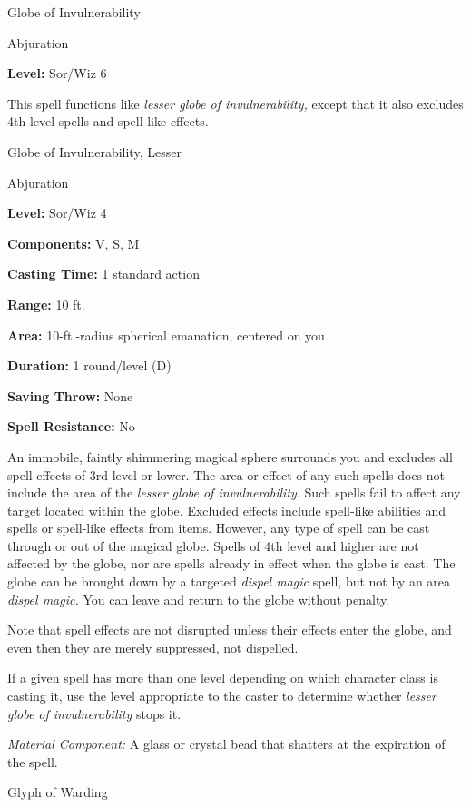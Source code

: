 \documentclass{article}
\begin{document}
\vspace{12pt}
Globe of Invulnerability

Abjuration

\textbf{Level:} Sor/Wiz 6

This spell functions like \textit{lesser globe of invulnerability, }except that 
it also excludes 4th-level spells and spell-like effects.

\vspace{12pt}
Globe of Invulnerability, Lesser

Abjuration

\textbf{Level:} Sor/Wiz 4

\textbf{Components:} V, S, M

\textbf{Casting Time:} 1 standard action

\textbf{Range:} 10 ft.

\textbf{Area:} 10-ft.-radius spherical emanation, centered on you

\textbf{Duration:} 1 round/level (D)

\textbf{Saving Throw:} None

\textbf{Spell Resistance:} No

An immobile, faintly shimmering magical sphere surrounds you and excludes all spell 
effects of 3rd level or lower. The area or effect of any such spells does not include 
the area of the \textit{lesser globe of invulnerability}. Such spells fail to affect 
any target located within the globe. Excluded effects include spell-like abilities 
and spells or spell-like effects from items. However, any type of spell can be 
cast through or out of the magical globe. Spells of 4th level and higher are not 
affected by the globe, nor are spells already in effect when the globe is cast. 
The globe can be brought down by a targeted \textit{dispel magic }spell, but not 
by an area \textit{dispel magic. }You can leave and return to the globe without 
penalty.

Note that spell effects are not disrupted unless their effects enter the globe, 
and even then they are merely suppressed, not dispelled. 

If a given spell has more than one level depending on which character class is 
casting it, use the level appropriate to the caster to determine whether \textit{lesser 
globe of invulnerability }stops it.

\textit{Material Component: }A glass or crystal bead that shatters at the expiration 
of the spell.

\vspace{12pt}
Glyph of Warding
\end{document}
